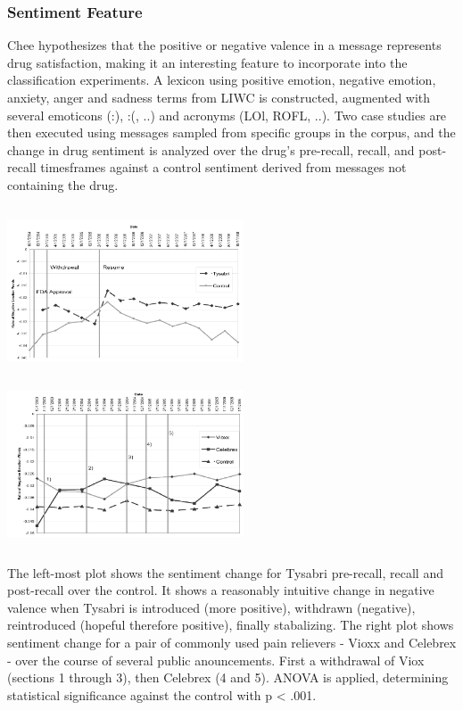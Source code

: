\documentclass[twoside,11pt]{article}
\begin{document}
\subsubsection{Sentiment Feature}
 Chee hypothesizes that the positive or negative valence in a message represents drug satisfaction, making it an interesting feature to incorporate into the classification experiments. A lexicon using positive emotion, negative emotion, anxiety, anger and sadness terms from LIWC is constructed, augmented with several emoticons (:), :(, ..) and acronyms (LOl, ROFL, ..). Two case studies are then executed using messages sampled from specific groups in the corpus, and the change in drug sentiment is analyzed over the drug's pre-recall, recall, and post-recall timesframes against a control sentiment derived from messages not containing the drug.

\includegraphics[width=7cm, height=5cm]{Figure-3-Tysabri.png}
\includegraphics[width=7cm, height=5cm]{Figure-4-Vioxx.png}

The left-most plot shows the sentiment change for Tysabri pre-recall, recall and post-recall over the control. It shows a reasonably intuitive change in negative valence when Tysabri is introduced (more positive), withdrawn (negative), reintroduced (hopeful therefore positive), finally stabalizing. The right plot shows sentiment change for a pair of commonly used pain relievers - Vioxx and Celebrex - over the course of several public anouncements. First a withdrawal of Viox (sections 1 through 3), then Celebrex (4 and 5). ANOVA is applied, determining statistical significance against the control with p < .001.
\end{document}
